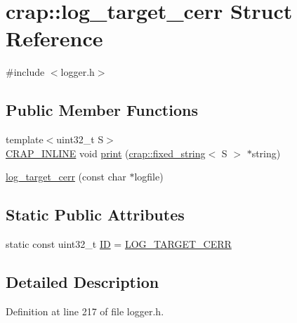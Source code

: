 \hypertarget{structcrap_1_1log__target__cerr}{\section{crap\+:\+:log\+\_\+target\+\_\+cerr Struct Reference}
\label{structcrap_1_1log__target__cerr}
}


{\ttfamily \#include $<$logger.\+h$>$}

\subsection*{Public Member Functions}
\begin{DoxyCompactItemize}
\item 
{\footnotesize template$<$uint32\+\_\+t S$>$ }\\\hyperlink{config__x86_8h_a5a40526b8d842e7ff731509998bb0f1c}{C\+R\+A\+P\+\_\+\+I\+N\+L\+I\+N\+E} void \hyperlink{structcrap_1_1log__target__cerr_abcfeb7020d79a180c659c0dbb0948e0f}{print} (\hyperlink{classcrap_1_1fixed__string}{crap\+::fixed\+\_\+string}$<$ S $>$ $\ast$string)
\item 
\hyperlink{structcrap_1_1log__target__cerr_a6d9eed4a0f329d9e46a17e293ef6e785}{log\+\_\+target\+\_\+cerr} (const char $\ast$logfile)
\end{DoxyCompactItemize}
\subsection*{Static Public Attributes}
\begin{DoxyCompactItemize}
\item 
static const uint32\+\_\+t \hyperlink{structcrap_1_1log__target__cerr_a33b6b749a34b045309cd086d81fa672a}{I\+D} = \hyperlink{logger_8h_a6d43164e0467f6d395fa0e0773535439}{L\+O\+G\+\_\+\+T\+A\+R\+G\+E\+T\+\_\+\+C\+E\+R\+R}
\end{DoxyCompactItemize}


\subsection{Detailed Description}


Definition at line 217 of file logger.\+h.



